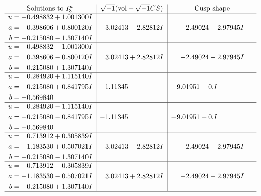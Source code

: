 \documentclass[1p]{elsarticle_modified}
\theoremstyle{definition}
\newcommand{\I}{\sqrt{-1}}
\begin{document}
$$\begin{array}{c|c|c}  
\text{Solutions to }I^u_{3}& \I (\text{vol} + \sqrt{-1}CS) & \text{Cusp shape}\\
 \hline 
\begin{aligned}
u &= -0.498832 + 1.001300 I \\
a &= \phantom{-}0.398606 + 0.800120 I \\
b &= -0.215080 - 1.307140 I\end{aligned}
 & \phantom{-}3.02413 - 2.82812 I & -2.49024 + 2.97945 I \\ \hline\begin{aligned}
u &= -0.498832 - 1.001300 I \\
a &= \phantom{-}0.398606 - 0.800120 I \\
b &= -0.215080 + 1.307140 I\end{aligned}
 & \phantom{-}3.02413 + 2.82812 I & -2.49024 - 2.97945 I \\ \hline\begin{aligned}
u &= \phantom{-}0.284920 + 1.115140 I \\
a &= -0.215080 + 0.841795 I \\
b &= -0.569840\phantom{ +0.000000I}\end{aligned}
 & -1.11345\phantom{ +0.000000I} & -9.01951 + 0. I\phantom{ +0.000000I} \\ \hline\begin{aligned}
u &= \phantom{-}0.284920 - 1.115140 I \\
a &= -0.215080 - 0.841795 I \\
b &= -0.569840\phantom{ +0.000000I}\end{aligned}
 & -1.11345\phantom{ +0.000000I} & -9.01951 + 0. I\phantom{ +0.000000I} \\ \hline\begin{aligned}
u &= \phantom{-}0.713912 + 0.305839 I \\
a &= -1.183530 + 0.507021 I \\
b &= -0.215080 - 1.307140 I\end{aligned}
 & \phantom{-}3.02413 - 2.82812 I & -2.49024 + 2.97945 I \\ \hline\begin{aligned}
u &= \phantom{-}0.713912 - 0.305839 I \\
a &= -1.183530 - 0.507021 I \\
b &= -0.215080 + 1.307140 I\end{aligned}
 & \phantom{-}3.02413 + 2.82812 I & -2.49024 - 2.97945 I\\
 \hline 
 \end{array}$$\newpage\newpage\renewcommand{\arraystretch}{1}
\end{document}
